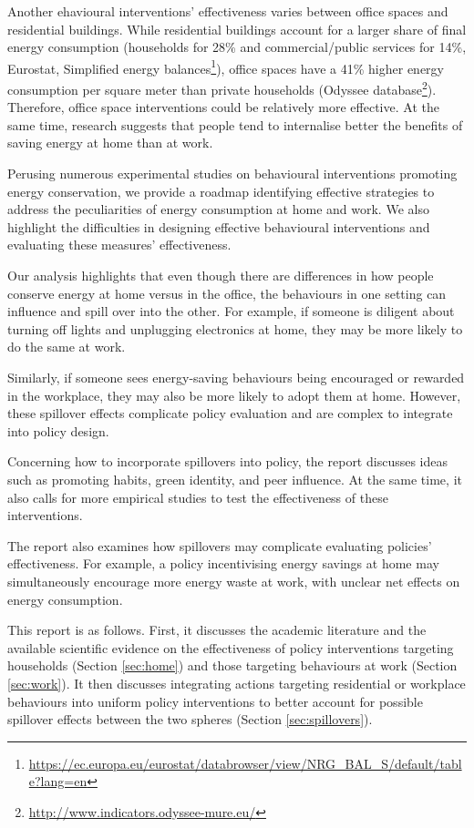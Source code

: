 \documentclass[
  11pt,
]{article}
\DeclareRobustCommand{\href}[2]{#2\footnote{\url{#1}}}
\begin{document}
Another ehavioural interventions' effectiveness varies between office
spaces and residential buildings. While residential buildings account
for a larger share of final energy consumption (households for 28\% and
commercial/public services for 14\%,
\href{https://ec.europa.eu/eurostat/databrowser/view/NRG_BAL_S/default/table?lang=en}{Eurostat,
Simplified energy balances}), office spaces have a 41\% higher energy
consumption per square meter than private households
(\href{http://www.indicators.odyssee-mure.eu/}{Odyssee database}).
Therefore, office space interventions could be relatively more
effective. At the same time, research suggests that people tend to
internalise better the benefits of saving energy at home than at work.

Perusing numerous experimental studies on behavioural interventions
promoting energy conservation, we provide a roadmap identifying
effective strategies to address the peculiarities of energy consumption
at home and work. We also highlight the difficulties in designing
effective behavioural interventions and evaluating these measures'
effectiveness.

Our analysis highlights that even though there are differences in how
people conserve energy at home versus in the office, the behaviours in
one setting can influence and spill over into the other. For example, if
someone is diligent about turning off lights and unplugging electronics
at home, they may be more likely to do the same at work.

Similarly, if someone sees energy-saving behaviours being encouraged or
rewarded in the workplace, they may also be more likely to adopt them at
home. However, these spillover effects complicate policy evaluation and
are complex to integrate into policy design.

Concerning how to incorporate spillovers into policy, the report
discusses ideas such as promoting habits, green identity, and peer
influence. At the same time, it also calls for more empirical studies to
test the effectiveness of these interventions.

The report also examines how spillovers may complicate evaluating
policies' effectiveness. For example, a policy incentivising energy
savings at home may simultaneously encourage more energy waste at work,
with unclear net effects on energy consumption.

This report is as follows. First, it discusses the academic literature
and the available scientific evidence on the effectiveness of policy
interventions targeting households (Section \ref{sec:home}) and those
targeting behaviours at work (Section \ref{sec:work}). It then discusses
integrating actions targeting residential or workplace behaviours into
uniform policy interventions to better account for possible spillover
effects between the two spheres (Section \ref{sec:spillovers}).
\end{document}
